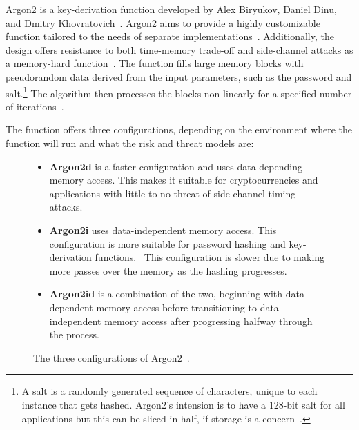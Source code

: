 Argon2 is a key-derivation function developed by Alex Biryukov, Daniel Dinu,
and Dmitry Khovratovich~\cite{argon2specs}.
Argon2 aims to provide a highly customizable function
tailored to the needs of separate implementations~\cite{argon2specs}.
Additionally, the design offers resistance to both time-memory trade-off and
side-channel attacks as a memory-hard function~\cite{argon2specs}.
The function fills large memory blocks with pseudorandom data derived from the
input parameters, such as the password and salt.\footnote{
  A salt is a randomly generated sequence of characters, unique to each instance
  that gets hashed. Argon2's intension is to have a 128-bit salt for all
  applications but this can be sliced in half, if storage is a
  concern~\cite{argon2specs}.
}
The algorithm then processes the blocks non-linearly for a specified number of
iterations~\cite{argon2specs}.

The function offers three configurations, depending on the environment where the
function will run and what the risk and threat models are:

\begin{figure}[htbp]
  \centering
  \begin{itemize}
    \item \textbf{Argon2d} is a faster configuration and uses data-depending
    memory access.
    This makes it suitable for cryptocurrencies and applications with little to
    no threat of side-channel timing attacks.\protect\footnotemark
    \item \textbf{Argon2i} uses data-independent memory access.
    This configuration is more suitable for password hashing and key-derivation
    functions.\protect\footnotemark
    ~This configuration is slower due to making more passes over the memory as
    the hashing progresses.
    \item \textbf{Argon2id} is a combination of the two, beginning with
    data-dependent memory access before transitioning to data-independent
    memory access after progressing halfway through the process.
  \end{itemize}
  \caption{The three configurations of Argon2~\cite{argon2specs}.}
  \label{fig:argon2conf}
\end{figure}


